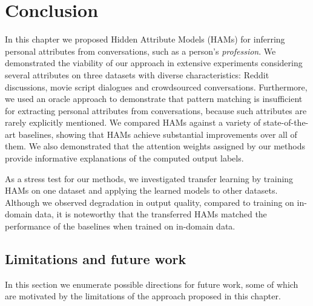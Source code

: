 \section{Conclusion}
In this chapter we proposed Hidden Attribute Models (HAMs) for inferring personal attributes from conversations, such as a person's \textit{profession}. 
We demonstrated the viability of our approach in extensive experiments considering several attributes on three datasets with diverse characteristics: Reddit discussions, movie script dialogues and crowdsourced conversations. 
Furthermore, we used an oracle approach to demonstrate that pattern matching is insufficient for extracting personal attributes from conversations, because such attributes are rarely explicitly mentioned.
We compared HAMs against a variety of state-of-the-art baselines, showing that HAMs achieve
substantial improvements over all of them. %
We also demonstrated that the attention weights assigned by our methods provide
informative explanations of the computed output labels.

As a stress test for our methods, we investigated transfer learning by
training HAMs on one dataset and applying the learned models to other datasets.
Although we observed degradation in output quality, compared to
training on in-domain data, it is noteworthy that the transferred HAMs
matched the performance of the baselines when trained on in-domain data.

\subsection{Limitations and future work}

In this section we enumerate possible directions for future work, some of which are motivated by the limitations of the approach proposed in this chapter.


